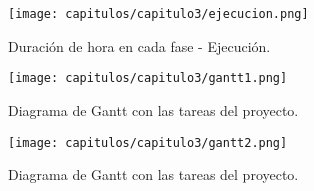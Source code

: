\begin{figure}[h]
    \centering
    \texttt{[image: capitulos/capitulo3/ejecucion.png]}
    \caption{Duración de hora en cada fase - Ejecución.}
    \label{fig:ejecucion}
\end{figure}


\begin{figure}[h]
    \centering
    \texttt{[image: capitulos/capitulo3/gantt1.png]}
    \caption{Diagrama de Gantt con las tareas del proyecto.}
    \label{fig:gant1}
\end{figure}

\begin{figure}[h]
    \centering
    \texttt{[image: capitulos/capitulo3/gantt2.png]}
    \caption{Diagrama de Gantt con las tareas del proyecto.}
    \label{fig:gant2}
\end{figure}
